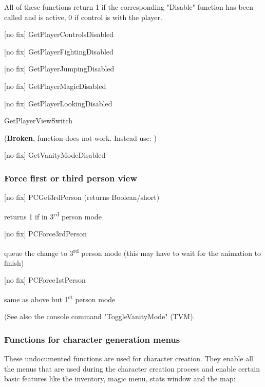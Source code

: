 All of these functions return 1 if the corresponding "Disable" function
has been called and is active, 0 if control is with the player.


{[}no fix{]} GetPlayerControlsDisabled

{[}no fix{]} GetPlayerFightingDisabled

{[}no fix{]} GetPlayerJumpingDisabled

{[}no fix{]} GetPlayerMagicDisabled

{[}no fix{]} GetPlayerLookingDisabled

GetPlayerViewSwitch

(\textbf{Broken}, function does not work. Instead use: )


{[}no fix{]} GetVanityModeDisabled

\hypertarget{force-first-or-third-person-view}{%
\subsubsection{Force first or third person
view}\label{force-first-or-third-person-view}}

{[}no fix{]} PCGet3rdPerson (returns Boolean/short)

returns 1 if in 3\textsuperscript{rd} person mode

{[}no fix{]} PCForce3rdPerson

queue the change to 3\textsuperscript{rd} person mode (this may have to
wait for the animation to finish)

{[}no fix{]} PCForce1stPerson

same as above but 1\textsuperscript{st} person mode

(See also the console command "ToggleVanityMode" (TVM).

\hypertarget{functions-for-character-generation-menus}{%
\subsubsection{Functions for character generation
menus}\label{functions-for-character-generation-menus}}

These undocumented functions are used for character creation. They
enable all the menus that are used during the character creation process
and enable certain basic features like the inventory, magic menu, stats
window and the map:

